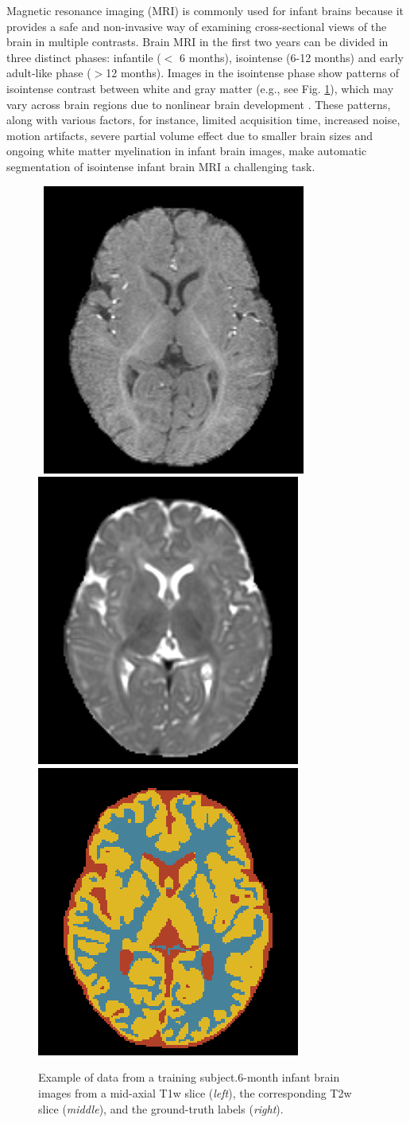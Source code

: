 \documentclass[twoside,espcrc2]{elsarticle}
\begin{document}
Magnetic resonance imaging (MRI) is commonly used for infant brains because it provides a safe and non-invasive way of examining cross-sectional views of the brain in multiple contrasts. Brain MRI in the first two years can be divided in three distinct phases: infantile ($<$ 6 months), isointense (6-12 months) and early adult-like phase ($>$12 months). Images in the isointense phase show patterns of isointense contrast between white and gray matter (e.g., see Fig. \ref{fig:isointense}), which may vary across brain regions due to nonlinear brain development \cite{paus2001maturation}. These patterns, along with various factors, for instance, limited acquisition time, increased noise, motion artifacts, severe partial volume effect due to smaller brain sizes and ongoing white matter myelination in infant brain images, make automatic segmentation of isointense infant brain MRI a challenging task. 

\begin{figure}[ht!]
     \begin{center}
     \mbox{
        \includegraphics[height=0.30\linewidth]{Pat1-T1.png}
        \hspace{-2.5 mm}
        \includegraphics[height=0.30\linewidth]{Pat1-T2.png}
        \hspace{-2.5 mm}
        \includegraphics[height=0.30\linewidth]{Pat1-Labels.png}
        }
\caption{Example of data from a training subject.6-month infant brain images from a mid-axial T1w slice (\textit{left}), the corresponding T2w slice (\textit{middle}), and the ground-truth labels (\textit{right}).}
\label{fig:isointense}
\end{center}
\end{figure}
\end{document}
